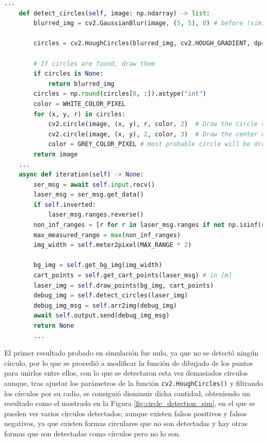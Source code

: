 \begin{code}[h!]
  \begin{lstlisting}[language=Python]
    ...
    def detect_circles(self, image: np.ndarray) -> list:
        blurred_img = cv2.GaussianBlur(image, (5, 5), 0) # before (sim) :image, (5, 5), 2

        circles = cv2.HoughCircles(blurred_img, cv2.HOUGH_GRADIENT, dp=1, minDist=40, param1=30, param2=25, minRadius=10, maxRadius=100)

        # If circles are found, draw them
        if circles is None:
            return blurred_img
        circles = np.round(circles[0, :]).astype("int")
        color = WHITE_COLOR_PIXEL
        for (x, y, r) in circles:
            cv2.circle(image, (x, y), r, color, 2)  # Draw the circle outline
            cv2.circle(image, (x, y), 2, color, 3)  # Draw the center of the circle
            color = GREY_COLOR_PIXEL # most probable circle will be drawn in white
        return image
    ...
    async def iteration(self) -> None:
        ser_msg = await self.input.recv()
        laser_msg = ser_msg.get_data()
        if self.inverted:
            laser_msg.ranges.reverse()
        non_inf_ranges = [r for r in laser_msg.ranges if not np.isinf(r)]
        max_measured_range = max(non_inf_ranges)
        img_width = self.meter2pixel(MAX_RANGE * 2)

        bg_img = self.get_bg_img(img_width)
        cart_points = self.get_cart_points(laser_msg) # in [m]
        laser_img = self.draw_points(bg_img, cart_points)
        debug_img = self.detect_circles(laser_img)
        debug_img_msg = self.arr2img(debug_img)
        await self.output.send(debug_img_msg)
        return None
        ...
  \end{lstlisting}
\caption[Funciones de detección de círculos de un nodo de Zenoh-Flow]{Funciones de detección de círculos de un nodo de Zenoh-Flow}
\label{cod:circle_detection}
\end{code}

El primer resultado probado en simulación fue nulo, ya que no se detectó ningún
círculo, por lo que se procedió a modificar la función de dibujado de los puntos
para unirlos entre ellos, con lo que se detectaron esta vez demasiados círculos
aunque, tras ajustar los parámetros de la función \verb|cv2.HoughCircles()| y
filtrando los círculos por su radio, se consiguió disminuir dicha cantidad,
obteniendo un resultado como el mostrado en la Figura
\ref{fig:circle_detection_sim}, en el que se pueden ver varios círculos
detectados; aunque existen falsos positivos y falsos negativos, ya que existen
formas circulares que no son detectadas y hay otras formas que son detectadas
como círculos pero no lo son.
\\

